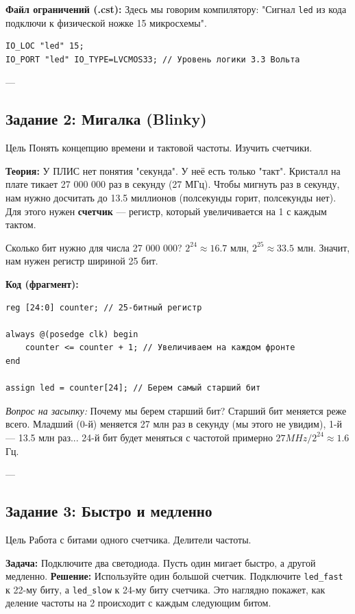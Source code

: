 \documentclass[12pt, a4paper]{article}
\begin{document}
\textbf{Файл ограничений (.cst):}
Здесь мы говорим компилятору: "Сигнал \texttt{led} из кода подключи к физической ножке 15 микросхемы".
\begin{lstlisting}
IO_LOC "led" 15;
IO_PORT "led" IO_TYPE=LVCMOS33; // Уровень логики 3.3 Вольта
\end{lstlisting}

---

\subsection{Задание 2: Мигалка (Blinky)}
\begin{taskbox}{Цель}
Понять концепцию времени и тактовой частоты. Изучить счетчики.
\end{taskbox}

\textbf{Теория:}
У ПЛИС нет понятия "секунда". У неё есть только "такт". Кристалл на плате тикает 27 000 000 раз в секунду (27 МГц).
Чтобы мигнуть раз в секунду, нам нужно досчитать до 13.5 миллионов (полсекунды горит, полсекунды нет).
Для этого нужен \textbf{счетчик} — регистр, который увеличивается на 1 с каждым тактом.

Сколько бит нужно для числа 27 000 000? $2^{24} \approx 16.7$ млн, $2^{25} \approx 33.5$ млн. Значит, нам нужен регистр шириной 25 бит.

\textbf{Код (фрагмент):}
\begin{lstlisting}
reg [24:0] counter; // 25-битный регистр

always @(posedge clk) begin
    counter <= counter + 1; // Увеличиваем на каждом фронте
end

assign led = counter[24]; // Берем самый старший бит
\end{lstlisting}

\textit{Вопрос на засыпку:} Почему мы берем старший бит? Старший бит меняется реже всего. Младший (0-й) меняется 27 млн раз в секунду (мы этого не увидим), 1-й — 13.5 млн раз... 24-й бит будет меняться с частотой примерно $27MHz / 2^{24} \approx 1.6$ Гц.

---

\subsection{Задание 3: Быстро и медленно}
\begin{taskbox}{Цель}
Работа с битами одного счетчика. Делители частоты.
\end{taskbox}

\textbf{Задача:} Подключите два светодиода. Пусть один мигает быстро, а другой медленно.
\textbf{Решение:} Используйте один большой счетчик. Подключите \texttt{led\_fast} к 22-му биту, а \texttt{led\_slow} к 24-му биту счетчика. Это наглядно покажет, как деление частоты на 2 происходит с каждым следующим битом.
\end{document}
